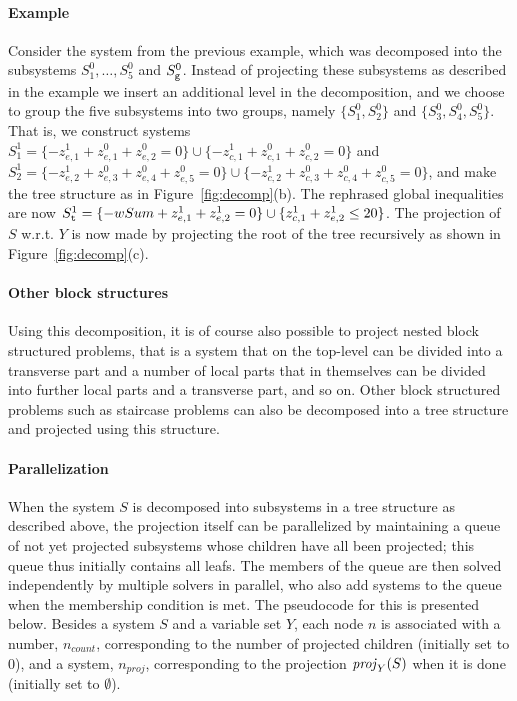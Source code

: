 \paragraph{Example}
Consider the system from the previous example, which was decomposed into the subsystems $S^0_1, \ldots, S^0_5$ and $S^0_{\texttt{g}}$. Instead of projecting these subsystems as described in the example we insert an additional level in the decomposition, and we choose to group the five subsystems into two groups, namely $\{S^0_1, S^0_2\}$ and $\{S^0_3, S^0_4, S^0_5\}$. 
That is, we construct systems $S^1_1=\{-z^1_{e,1} + z^0_{e,1}+z^0_{e,2} = 0\}\cup \{-z^1_{c,1} + z^0_{c,1}+z^0_{c,2} = 0\}$ and $S^1_2=\{-z^1_{e,2} +z^0_{e,3}+ z^0_{e,4}+z^0_{e,5} = 0\}\cup \{-z^1_{c,2} +z^0_{c,3}+ z^0_{c,4}+z^0_{c,5} = 0\}$, and make the tree structure as in Figure~\ref{fig:decomp}(b). The rephrased global inequalities are now $S_{\texttt{t}}^1 = \{-wSum + z^1_{e,1} + z^1_{e,2} = 0 \} \cup \{ z^1_{c,1} + z^1_{e,2} \leq 20\}$.   
%
The projection of $S$ w.r.t. $Y$ is now made by projecting the root of the tree recursively as shown in Figure~\ref{fig:decomp}(c).

\paragraph{Other block structures} 
Using this decomposition, it is of course also possible to project nested block structured problems, that is a system that on the top-level can be divided into a transverse part and a number of local parts that in themselves can be divided into further local parts and a transverse part, and so on.  
Other block structured problems such as staircase problems can also be decomposed into a tree structure and projected using this structure. 

\paragraph{Parallelization}
When the system $S$ is decomposed into subsystems in a tree structure as described above, the projection itself can be parallelized by maintaining a queue of not yet projected subsystems whose children have all been projected; this queue thus initially contains all leafs. 
The members of the queue are then solved independently by multiple solvers in parallel, who also add systems to the queue when the membership condition is met.
The pseudocode for this is presented below. Besides a system $S$ and a variable set $Y$, each node $n$ is associated with a number, $n_{count}$, corresponding to the number of projected children (initially set to $0$), and a system, $n_{proj}$, corresponding to the projection $\mathit{proj}_Y(S)$ when it is done (initially set to $\emptyset$). 

